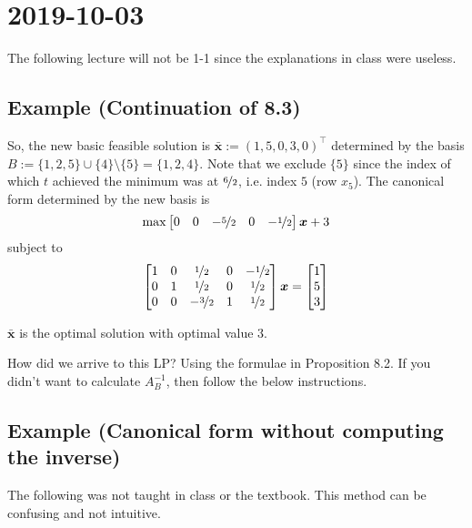 \section{2019-10-03}
\begin{remark}
    The following lecture will not be 1-1 since the explanations in class were useless.
\end{remark}

\subsection{Example (Continuation of 8.3)}
So, the new basic feasible solution is $\bm{\bar{x}}:=(1,5,0,3,0)^\top$
determined by the basis $B:=\{1,2,5\}\cup\{4\}\setminus \{5\}=\{1,2,4\}$. Note that
we exclude $\{5\}$ since the index of which $t$ achieved the minimum was at
$\nicefrac{6}{2}$, i.e. index $5$ (row $x_5$). The canonical form determined by the new
basis is
\[\max \begin{bmatrix}
    0 & 0 & -\nicefrac{5}{2} & 0 & -\nicefrac{1}{2}
\end{bmatrix}\bm{x}+3\]
subject to
\[
\begin{bmatrix}
    1 & 0 & \nicefrac{1}{2} & 0 & -\nicefrac{1}{2}\\
    0 & 1 & \nicefrac{1}{2} & 0 & \nicefrac{1}{2}\\
    0 & 0 & -\nicefrac{3}{2} & 1 & \nicefrac{1}{2}
\end{bmatrix}\bm{x}
=
\begin{bmatrix}
    1\\
    5\\
    3
\end{bmatrix}
\]
\begin{remark}
    $\bm{\bar{x}}$ is the optimal solution with optimal value $3$.
\end{remark}
\begin{remark}
    How did we arrive to this LP? Using the formulae in Proposition 8.2. If you didn't want to
    calculate $A_B^{-1}$, then follow the below instructions.
\end{remark}

\subsection{Example (Canonical form without computing the inverse)}
\begin{remark}
    The following was not taught in class or the textbook. 
    This method can be confusing and not intuitive.
\end{remark}


